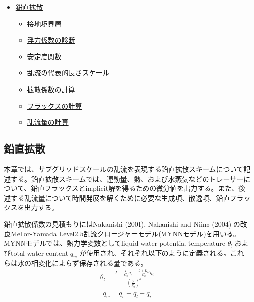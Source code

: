 \begin{itemize}
\tightlist
\item
  \protect\hyperlink{ux925bux76f4ux62e1ux6563}{鉛直拡散}

  \begin{itemize}
  \tightlist
  \item
    \protect\hyperlink{ux63a5ux5730ux5883ux754cux5c64}{接地境界層}
  \item
    \protect\hyperlink{ux6d6eux529bux4fc2ux6570ux306eux8a3aux65ad}{浮力係数の診断}
  \item
    \protect\hyperlink{ux5b89ux5b9aux5ea6ux95a2ux6570}{安定度関数}
  \item
    \protect\hyperlink{ux4e71ux6d41ux306eux4ee3ux8868ux7684ux9577ux3055ux30b9ux30b1ux30fcux30eb}{乱流の代表的長さスケール}
  \item
    \protect\hyperlink{ux62e1ux6563ux4fc2ux6570ux306eux8a08ux7b97}{拡散係数の計算}
  \item
    \protect\hyperlink{ux30d5ux30e9ux30c3ux30afux30b9ux306eux8a08ux7b97}{フラックスの計算}
  \item
    \protect\hyperlink{ux4e71ux6d41ux91cfux306eux8a08ux7b97}{乱流量の計算}
  \end{itemize}
\end{itemize}

\hypertarget{ux925bux76f4ux62e1ux6563}{%
\subsection{鉛直拡散}\label{ux925bux76f4ux62e1ux6563}}

本章では、サブグリッドスケールの乱流を表現する鉛直拡散スキームについて記述する。鉛直拡散スキームでは、運動量、熱、および水蒸気などのトレーサーについて、鉛直フラックスとimplicit解を得るための微分値を出力する。また、後述する乱流量について時間発展を解くために必要な生成項、散逸項、鉛直フラックスを出力する。

鉛直拡散係数の見積もりにはNakanishi (2001), Nakanishi and Niino (2004)
の改良Mellor-Yamada
Level2.5乱流クロージャーモデル(MYNNモデル)を用いる。MYNNモデルでは、熱力学変数としてliquid
water potential temperature \(\theta_l\) およびtotal water content
\(q_w\)
が使用され、それぞれ以下のように定義される。これらは水の相変化によらず保存される量である。
\begin{eqnarray} \theta_l=\frac{ T - \frac{L}{C_p}q_l - \frac{L+L_{M}}{C_p}q_i }{\left(\frac{p}{p_0}\right)^\kappa } \end{eqnarray}
\begin{eqnarray}q_w=q_v+q_l+q_i\end{eqnarray}

